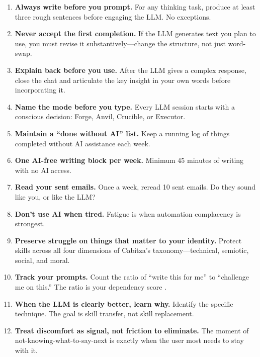 \documentclass[11pt,a4paper]{article}
\begin{document}
\begin{enumerate}
    \item \textbf{Always write before you prompt.} For any thinking task, produce
    at least three rough sentences before engaging the LLM. No exceptions.

    \item \textbf{Never accept the first completion.} If the LLM generates text
    you plan to use, you must revise it substantively---change the structure, not
    just word-swap.

    \item \textbf{Explain back before you use.} After the LLM gives a complex
    response, close the chat and articulate the key insight in your own words
    before incorporating it.

    \item \textbf{Name the mode before you type.} Every LLM session starts with a
    conscious decision: Forge, Anvil, Crucible, or Executor.

    \item \textbf{Maintain a ``done without AI'' list.} Keep a running log of
    things completed without AI assistance each week.

    \item \textbf{One AI-free writing block per week.} Minimum 45 minutes of
    writing with no AI access.

    \item \textbf{Read your sent emails.} Once a week, reread 10 sent emails. Do
    they sound like you, or like the LLM?

    \item \textbf{Don't use AI when tired.} Fatigue is when automation
    complacency is strongest.

    \item \textbf{Preserve struggle on things that matter to your identity.}
    Protect skills across all four dimensions of
    Cabitza's taxonomy---technical, semiotic, social, and moral.

    \item \textbf{Track your prompts.} Count the ratio of ``write this for me''
    to ``challenge me on this.'' The ratio is your dependency score
    \citep{cabitza2023dominion}.

    \item \textbf{When the LLM is clearly better, learn why.} Identify the
    specific technique. The goal is skill transfer, not skill replacement.

    \item \textbf{Treat discomfort as signal, not friction to eliminate.} The
    moment of not-knowing-what-to-say-next is exactly when the user most needs to
    stay with it.
\end{enumerate}
\end{document}
